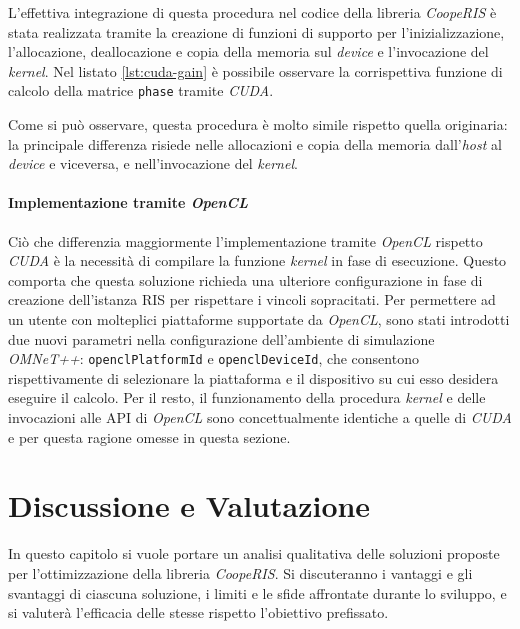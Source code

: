 L'effettiva integrazione di questa procedura nel codice della libreria \textit{CoopeRIS}
è stata realizzata tramite la creazione di funzioni di supporto per l'inizializzazione,
l'allocazione, deallocazione e copia della memoria sul \textit{device} e l'invocazione
del \textit{kernel}. Nel listato \ref{lst:cuda-gain} è possibile osservare la
corrispettiva funzione di calcolo della matrice \texttt{phase} tramite \textit{CUDA}.



Come si può osservare, questa procedura è molto simile rispetto quella
originaria: la principale differenza risiede nelle allocazioni e copia della memoria
dall'\textit{host} al \textit{device} e viceversa, e nell'invocazione del
\textit{kernel}.

\paragraph{Implementazione tramite \textit{OpenCL}}
\label{para:opencl}

Ciò che differenzia maggiormente l'implementazione tramite \textit{OpenCL}
rispetto \textit{CUDA} è la necessità di compilare la funzione \textit{kernel}
in fase di esecuzione. Questo comporta che questa soluzione richieda una ulteriore
configurazione in fase di creazione dell'istanza RIS per rispettare i vincoli sopracitati.
Per permettere ad un utente con molteplici piattaforme supportate da \textit{OpenCL},
sono stati introdotti due nuovi parametri nella configurazione dell'ambiente di
simulazione \textit{OMNeT++}: \texttt{openclPlatformId} e \texttt{openclDeviceId},
che consentono rispettivamente di selezionare la piattaforma e il dispositivo su
cui esso desidera eseguire il calcolo. Per il resto, il funzionamento della procedura
\textit{kernel} e delle invocazioni alle API di \textit{OpenCL} sono concettualmente
identiche a quelle di \textit{CUDA} e per questa ragione omesse in questa
sezione.

\section{Discussione e Valutazione}
\label{ch:discussione}

In questo capitolo si vuole portare un analisi qualitativa delle soluzioni proposte
per l'ottimizzazione della libreria \textit{CoopeRIS}. Si discuteranno i vantaggi
e gli svantaggi di ciascuna soluzione, i limiti e le sfide affrontate durante lo
sviluppo, e si valuterà l'efficacia delle stesse rispetto l'obiettivo prefissato.

